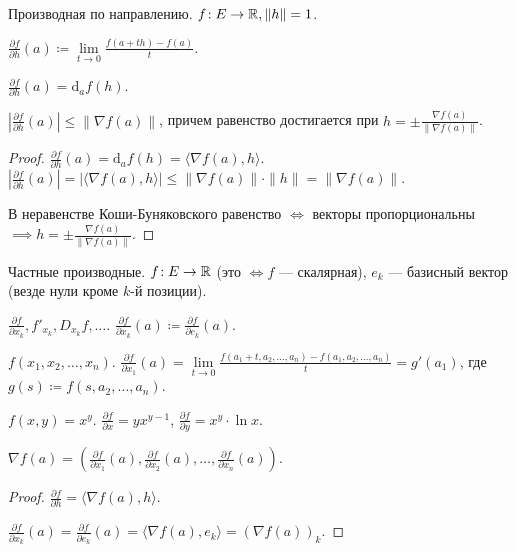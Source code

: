 \begin{definition}
    Производная по направлению. $f\!: E \to \mathbb{R}, \|h\|=1$.

     $\frac{\partial f}{\partial h}(a) \coloneqq \lim\limits_{t \to 0} \frac{f(a+th) - f(a)}{t}$.
\end{definition}
\begin{remark}
    $\frac{\partial f}{\partial h}(a) = \mathrm{d}_af(h)$.
\end{remark}
\begin{theorem}
    $\left| \frac{\partial f}{\partial h}(a) \right| \le \|\nabla f(a)\|$, причем равенство достигается при $h = \pm \frac{\nabla f(a)}{\|\nabla f(a)\|}$.
\end{theorem}
\begin{proof}
    $\frac{\partial f}{\partial h}(a) = \mathrm{d}_af(h) = \langle \nabla f(a), h \rangle$.
\\
    $\left| \frac{\partial f}{\partial h}(a) \right| = | \langle \nabla f(a), h \rangle | \le \|\nabla f(a) \| \cdot \|h\| = \|\nabla f(a)\|$.

    В неравенстве Коши-Буняковского равенство $\iff$ векторы пропорциональны  $\implies h = \pm \frac{\nabla f(a)}{\|\nabla f(a)\|}$.
\end{proof}
\begin{definition}
    Частные производные. $f\!: E \to \mathbb{R}$ (это $\iff f$ --- скалярная), $e_k$ --- базисный вектор (везде нули кроме $k$-й позиции).

     $\frac{\partial f}{\partial x_k}, f'_{x_k}, D_{x_k}f,\ldots$. $\frac{\partial f}{\partial x_k} (a) \coloneqq \frac{\partial f}{\partial e_k}(a)$.
\end{definition}
\begin{remark}
    $f(x_1, x_2, \ldots, x_n)$. $\frac{\partial f}{\partial x_1}(a) = \lim\limits_{t \to 0} \frac{f(a_1 + t, a_2, \ldots,a_n) - f(a_1, a_2,\ldots, a_n)}{t} = g'(a_1)$, где $g(s) \coloneqq f(s, a_2, \ldots, a_n)$.
\end{remark}
\begin{example}
    $f(x, y) = x^y$.  $\frac{\partial f}{\partial x} = yx^{y-1}$, $\frac{\partial f}{\partial y} = x^y \cdot \ln x$.
\end{example}
\begin{theorem}
    $\nabla f(a) = \left( \frac{\partial f}{\partial x_1}(a), \frac{\partial f}{\partial x_2}(a), \ldots, \frac{\partial f}{\partial x_n}(a) \right)$.
\end{theorem}
\begin{proof}
   $\frac{\partial f}{\partial h} = \langle \nabla f(a), h \rangle$.

   $\frac{\partial f}{\partial x_k}(a) = \frac{\partial f}{\partial e_k}(a) = \langle \nabla f(a), e_k \rangle = (\nabla f(a))_k$.
\end{proof}
